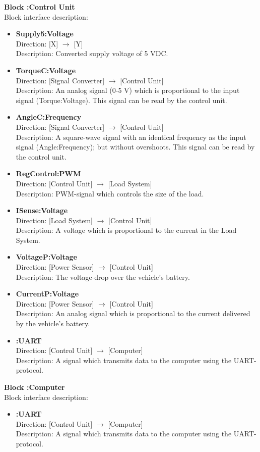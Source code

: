 \textbf{Block :Control Unit}\\
Block interface description:
\begin{itemize}
	\item \textbf{Supply5:Voltage}\\
	Direction: [X] $\rightarrow$ [Y]\\
	Description: Converted supply voltage of 5 VDC.
	\item \textbf{TorqueC:Voltage}\\
	Direction: [Signal Converter] $\rightarrow$ [Control Unit]\\
	Description: An analog signal (0-5 V) which is proportional to the input signal (Torque:Voltage). This signal can be read by the control unit.
	\item \textbf{AngleC:Frequency}\\	
	Direction: [Signal Converter] $\rightarrow$ [Control Unit]\\
	Description: A square-wave signal with an identical frequency as the input signal (Angle:Frequency); but without overshoots. This signal can be read by the control unit.
	\item \textbf{RegControl:PWM}\\
	Direction: [Control Unit] $\rightarrow$ [Load System]\\
	Description: PWM-signal which controls the size of the load.
	\item \textbf{ISense:Voltage}\\
	Direction: [Load System] $\rightarrow$ [Control Unit]\\
	Description: A voltage which is proportional to the current in the Load System.
	\item \textbf{VoltageP:Voltage}\\
	Direction: [Power Sensor] $\rightarrow$ [Control Unit]\\
	Description: The voltage-drop over the vehicle's battery.
	\item \textbf{CurrentP:Voltage}\\
	Direction: [Power Sensor] $\rightarrow$ [Control Unit]\\
	Description: An analog signal which is proportional to the current delivered by the vehicle's battery.
	\item \textbf{:UART}\\
	Direction: [Control Unit] $\rightarrow$ [Computer]\\
	Description: A signal which transmits data to the computer using the UART-protocol.
\end{itemize}
										
\textbf{Block :Computer}\\
Block interface description:
\begin{itemize}
	\item \textbf{:UART}\\
	Direction: [Control Unit] $\rightarrow$ [Computer]\\
	Description: A signal which transmits data to the computer using the UART-protocol.
\end{itemize}